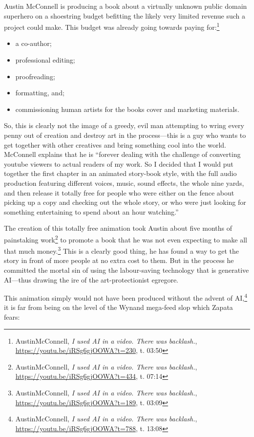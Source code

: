 \documentclass[11pt]{article}
\begin{document}
Austin McConnell is producing a book about a virtually unknown public domain superhero on a shoestring budget befitting the likely very limited revenue such a project could make. This budget was already going towards paying for:\footnote{AustinMcConnell, \emph{I used AI in a video. There was backlash.}, \url{https://youtu.be/iRSg6gjOOWA?t=230}, t. 03:50}
\begin{itemize}
\item a co-author;
\item professional editing;
\item proofreading;
\item formatting, and;
\item commissioning human artists for the books cover and marketing materials.
\end{itemize}

So, this is clearly not the image of a greedy, evil man attempting to wring every penny out of creation and destroy art in the process---this is a guy who wants to get together with other creatives and bring something cool into the world. McConnell explains that he is ``forever dealing with the challenge of converting youtube viewers to actual readers of my work. So I decided that I would put together the first chapter in an animated story-book style, with the full audio production featuring different voices, music, sound effects, the whole nine yards, and then release it totally free for people who were either on the fence about picking up a copy and checking out the whole story, or who were just looking for something entertaining to spend about an hour watching.''

The creation of this totally free animation took Austin about five months of painstaking work\footnote{AustinMcConnell, \emph{I used AI in a video. There was backlash.}, \url{https://youtu.be/iRSg6gjOOWA?t=434}, t. 07:14} to promote a book that he was not even expecting to make all that much money.\footnote{AustinMcConnell, \emph{I used AI in a video. There was backlash.}, \url{https://youtu.be/iRSg6gjOOWA?t=189}, t. 03:09} This is a clearly good thing, he has found a way to get the story in front of more people at no extra cost to them. But in the process he committed the mortal sin of using the labour-saving technology that is generative AI---thus drawing the ire of the art-protectionist egregore.

This animation simply would not have been produced without the advent of AI,\footnote{AustinMcConnell, \emph{I used AI in a video. There was backlash.}, \url{https://youtu.be/iRSg6gjOOWA?t=788}, t. 13:08} it is far from being on the level of the Wynand mega-feed slop which Zapata fears:
\end{document}
